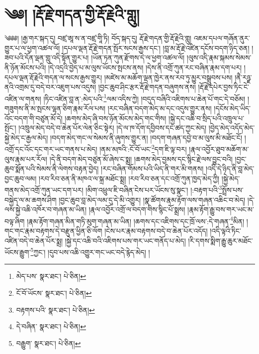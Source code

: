 \setcounter{footnote}{0} 
\chapter{༄༅། །རྡོ་རྗེ་གདན་གྱི་རྡོ་རྗེའི་གླུ།}༄༅༅། །རྒྱ་གར་སྐད་དུ། བཛྲ་ཨཱ་ས་ན་བཛྲ་གཱི་ཏི། བོད་སྐད་དུ། རྡོ་རྗེ་གདན་གྱི་རྡོ་རྗེའི་གླུ། འཇམ་དཔལ་གཞོན་ནུར་གྱུར་པ་ལ་ཕྱག་འཚལ་ལོ། །དཔལ་ལྡན་རྡོ་རྗེ་གདན་སྤོར་སངས་རྒྱས་དང་། །བླ་མ་རྡོ་རྗེ་འཛིན་དངོས་བདག་ཉིད་ཅན། །ཟབ་པའི་དོན་ལྡན་གླུ་འདི་སྟོན་གྱུར་པ། །ཡོན་ཏན་ཀུན་རྫོགས་དེ་ལ་ཕྱག་འཚལ་ལོ། །ལུས་འདི་རྣམ་སྐམས་སེམས་ནི་ཉོན་མོངས་པའི། །དེ་འདྲའི་བྱེད་པ་མ་ལུས་ཡོངས་སྤངས་ནས། །དེས་ནི་འགྲོ་ཀུན་རང་བཞིན་རྣམ་དག་པར། །དཔལ་ལྡན་རྡོ་རྗེའི་གདན་ལ་སངས་རྒྱས་གྱུར། །མཛེས་མ་མཆོག་ལྡན་ཁྱེར་ནས་རབ་ཏུ་མྱུར་བསྒྲུབས་པས། །ནཻ་རཉྫ་ནའི་འགྲམ་དུ་བདེ་བར་འཇུག་པས་འདུས། །བྱང་ཆུབ་ཤིང་རྩར་རྡོ་རྗེ་གདན་བཞུགས་ནས། །རྡོ་རྗེ་དཔེར་བྱས་ཏིང་ངེ་འཛིན་ལ་གནས། །ཏིང་འཛིན་བླ་ན་:མེད་པའི་\footnote{མེད་པས་  སྣར་ཐང་།  པེ་ཅིན། }ལམ་འདིས་ཀྱེ། །བདུད་བཞིའི་འཇིགས་པ་ཆེན་པོ་གང་དེ་བཅོམ། །གཟུགས་ནི་མ་སྤངས་ལྷན་ཅིག་རྣམ་རོལ་པས། །རང་བཞིན་བདག་མེད་མ་དང་འདུས་གྱུར་ནས། །དངོས་མེད་ཡིད་འོང་བདག་གི་བཙུན་མོ་དེ། །ཆགས་མེད་ཞི་བས་ཉོན་མོངས་མེད་གང་གིས། །སྐྱེ་དང་འཆི་བ་སྲིད་པའི་འཁྲུལ་པ་སྤོང་། །འཁྲུལ་མེད་བདེ་བ་ཆེན་པོར་ལེན་ཅིང་སྟེར། །དེ་ལ་ཁ་དོག་དབྱིབས་དང་ཚད་ཀྱང་མེད། །བྱེད་མེད་འདོད་མེད་སྐྱེ་མེད་ང་རྒྱལ་མེད། །བདག་མེད་གང་ལ་སེམས་ནི་ཞུགས་གྱུར་ན། །བདག་གཞན་དབྱེ་བ་མ་ལུས་མི་མཐོང་ངོ། །འགྲོ་དང་འོང་དང་གར་ཡང་གནས་པ་མེད། །ནམ་མཁའི་:ངོ་བོ་ཡང་\footnote{ངོ་བོ་ཡོངས་  སྣར་ཐང་།  པེ་ཅིན། }དག་ཇི་ལྟ་བར། །རྣལ་འབྱོར་ཐུབ་མཆོག་མ་ལུས་རྣམ་པར་རོལ། །དེ་ནི་བདག་མེད་བཙུན་མོ་ཞེས་ང་སྨྲ། །ཆགས་མེད་བྱམས་དང་སྙིང་རྗེ་ལས་བྱུང་བའི། །བྱང་ཆུབ་སྨོན་པའི་སེམས་ནི་ལེགས་བརྟན་བྱེད། །རང་བཞིན་གོམས་པའི་ཡིད་ནི་གར་མི་གནས། །འདི་དེ་ཉིད་ནི་བླ་མེད་བྱང་ཆུབ་ལམ། །རབ་རིབ་ཅན་ནི་མཁའ་ལ་སྐྲ་མཐོང་སྨྲ། །རབ་རིབ་ཅན་དང་འགྲོ་ཀུན་ཁྱད་མེད་ཀྱི། །སྐྱེ་མེད་གནས་མེད་འགྲོ་ཀུན་ཡང་དག་པར། །མིག་འཕྲུལ་ཇི་བཞིན་ངེས་པར་ཡོངས་སུ་སྣང་། །:བརྟག་པའི་\footnote{བརྟགས་པའི་  སྣར་ཐང་།  པེ་ཅིན། }སྤྲོས་པས་བསྐྱེད་ལ་མ་ཆགས་ཤིག །བྱང་ཆུབ་བླ་མེད་ལམ་དུ་དེ་མི་འགྱུར། །སྣ་ཚོགས་རྣམ་རྟོག་ལས་གཞན་འཆིང་བ་མེད། །དེ་ལས་སྐྱེ་འཆི་འཁོར་བ་གཞན་མ་ཡིན། །རྣལ་འབྱོར་འགྲོ་ལ་བདག་གིས་སྙིང་པོ་སྨྲས། །རྣམ་རྟོག་རྒྱུ་བས་གར་ཡང་མ་བལྟ་ཞིག །རྣམ་རྟོག་གཞན་མིན་གཏི་མུག་གཞན་མ་ཡིན། །ཆགས་དང་འཇིགས་དང་ཁྲོ་ལས་:དེ་གཞན་\footnote{དེ་བཞིན་  སྣར་ཐང་།  པེ་ཅིན། }མིན། །གང་གང་རྣམ་བརྟགས་དེ་བརྫུན་ཕྱིན་ཅི་ལོག །ངེས་པར་རྣམ་བརྟགས་བདེ་བ་ཆེན་པོར་འདོད། །འདི་ལྟའི་ཏིང་འཛིན་བདེ་བ་ཆེན་པོར་སྨྲ། །སྐྱེ་དང་འཆི་བའི་འཇིགས་པས་གར་ཡང་གནོད་པ་མེད། །རི་དགས་སྨིག་རྒྱུ་ཆུར་མཐོང་ཡོངས་རྒྱུག་\footnote{བརྒྱུག་  སྣར་ཐང་།  པེ་ཅིན། }ཀྱང་། །དུབ་པས་འཆི་འགྱུར་གང་ཡང་བདེ་རྙེད་མེད། །
